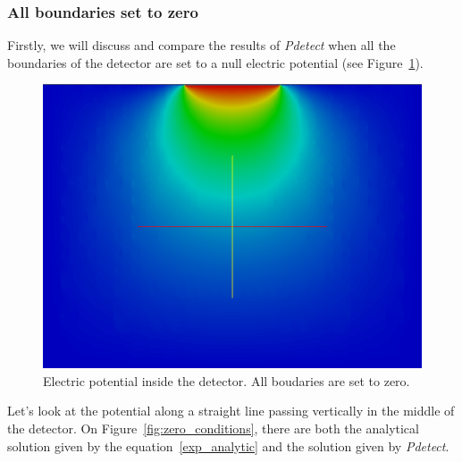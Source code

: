 \documentclass[11pt]{article}
\begin{document}
		\subsubsection{All boundaries set to zero}

			Firstly, we will discuss and compare the results of \textit{Pdetect} when all the
			boundaries of the detector are set to a null electric potential
			(see Figure~\ref{fig:w_zero_conditions}).

			\begin{figure}[H]
				\center
				\includegraphics[scale=0.4]{images/boundary_conditions/w_zero_conditions.png}
				\caption{Electric potential inside the detector. All boudaries are set to zero.}
				\label{fig:w_zero_conditions}
			\end{figure}

			Let's look at the potential along a straight line passing vertically in the middle of
			the detector. On Figure~\ref{fig:zero_conditions}, there are both the analytical solution
			given by the equation~\ref{exp_analytic} and the solution given by \textit{Pdetect}.
\end{document}
